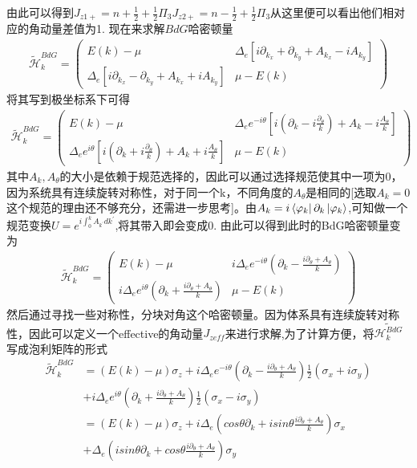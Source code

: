 \documentclass[22pt]{article}
\begin{document}
由此可以得到$J_{z1+}=n+\frac{1}{2}+\frac{1}{2}\Pi_3$\qquad$J_{z2+}=n-\frac{1}{2}+\frac{1}{2}\Pi_3$从这里便可以看出他们相对应的角动量差值为1.
现在来求解$BdG$哈密顿量
\begin{align}
	\nonumber
	\tilde{\mathcal{H}}_k^{BdG}=
	\begin{pmatrix}
		E(k)-\mu  & 
		\Delta_e[i\partial_{k_x}+\partial_{k_y}+A_{k_x}-iA_{k_y}]\\
		\Delta_e[i\partial_{k_x}-\partial_{k_y}+A_{k_x}+iA_{k_y}] & \mu-E(k)
	\end{pmatrix}
\end{align}
将其写到极坐标系下可得
\begin{align}
	\nonumber
	\tilde{\mathcal{H}}_k^{BdG}=
	\begin{pmatrix}
		E(k)-\mu  & \Delta_ee^{-i\theta}[i(\partial_k-i\frac{\partial_{\theta}}{k})+A_k-i\frac{A_{\theta}}{k}]\\
		\Delta_ee^{i\theta}[i(\partial_k+i\frac{\partial_{\theta}}{k})+A_k+i\frac{A_{\theta}}{k}] & \mu-E(k)
	\end{pmatrix}
\end{align}
其中$A_k,A_{\theta}$的大小是依赖于规范选择的，因此可以通过选择规范使其中一项为0，因为系统具有连续旋转对称性，对于同一个k，不同角度的$A_{\theta}$是相同的[选取$A_k=0$这个规范的理由还不够充分，还需进一步思考]。由$A_k=i\bra{\varphi_k}\partial_k\ket{\varphi_k}$,可知做一个规范变换$U=e^{i\int_0^{k}A_{k^{'}}dk^{'}}$,将其带入即会变成0.
由此可以得到此时的BdG哈密顿量变为
\begin{align}
	\tilde{\mathcal{H}}_k^{BdG}=
	\begin{pmatrix}
		E(k)-\mu  & i\Delta_ee^{-i\theta}(\partial_k-\frac{i\partial_{\theta}+A_{\theta}}{k})\\
		i\Delta_ee^{i\theta}(\partial_k+\frac{i\partial_{\theta}+A_{\theta}}{k})
		&  \mu-E(k)
	\end{pmatrix}
\end{align}
然后通过寻找一些对称性，分块对角这个哈密顿量。因为体系具有连续旋转对称性，因此可以定义一个effective的角动量$J_{zeff}$来进行求解,为了计算方便，将$\tilde{\mathcal{H}_k^{BdG}}$写成泡利矩阵的形式
\begin{align}
	\tilde{\mathcal{H}}_k^{BdG}&=(E(k)-\mu)\sigma_z+i\Delta_ee^{-i\theta}(\partial_k-\frac{i\partial_{\theta}+A_{\theta}}{k})\frac{1}{2}(\sigma_x+i\sigma_y)\\
	&+i\Delta_ee^{i\theta}(\partial_k+\frac{i\partial_{\theta}+A_{\theta}}{k})\frac{1}{2}(\sigma_x-i\sigma_y)\\
	&=(E(k)-\mu)\sigma_z+i\Delta_e(cos\theta\partial_k+isin\theta\frac{i\partial_{\theta}+A_{\theta}}{k})\sigma_x\\
	&+\Delta_e(isin\theta\partial_k+cos\theta\frac{i\partial_{\theta}+A_{\theta}}{k})\sigma_y
\end{align}
\end{document}

